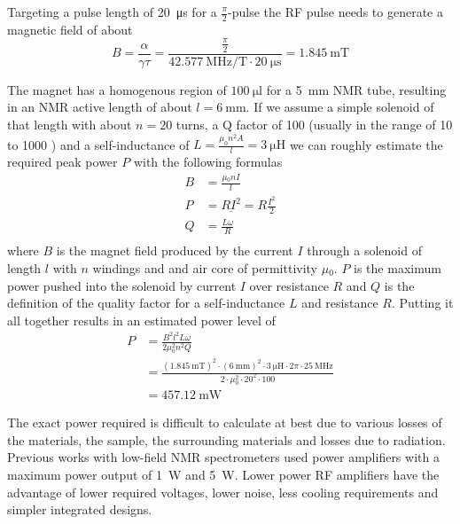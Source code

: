 Targeting a pulse length of \qty{20}{\micro\second} for a  \(\frac{\pi}{2}\)-pulse the RF pulse needs to generate a magnetic field of about
\[
    B = \frac{\alpha}{\gamma\tau} = \frac{\frac{\pi}{2}}{\qty{42.577}{\mega\hertz\per\tesla}\cdot{}\qty{20}{\micro\second}} = \qty{1.845}{\milli\tesla}
\]

The magnet has a homogenous region of \(\qty{100}{\micro\litre}\) for a \qty{5}{\milli\meter} NMR tube, resulting in an NMR active length of about \(l = \qty{6}{\milli\meter}\). If we assume a simple solenoid of that length with about \(n = 20\) turns, a Q factor of 100 (usually in the range of 10 to 1000 \cite{mispelterNMRProbeheadsBiophysical2015}) and a self-inductance of \(L = \frac{\mu_0n^2A}{l} = \qty{3}{\micro\henry}\) we can roughly estimate the required peak power \(P\) with the following formulas 
\begin{align}
    B & = \frac{\mu{}_0nI}{l}              \\
    P & = R\underbar{I}^2 = R\frac{I^2}{2} \\
    Q & = \frac{L\omega}{R}                \\
\end{align}
where \(B\) is the magnet field produced by the current \(I\) through a solenoid of length \(l\) with \(n\) windings and and air core of permittivity \(\mu{}_0\). \(P\) is the maximum power pushed into the solenoid by current \(I\) over resistance \(R\) and \(Q\) is the definition of the quality factor for a self-inductance \(L\) and resistance \(R\). Putting it all together results in an estimated power level of
\begin{align}
    P & = \frac{B^2l^2L\omega}{2\mu{}_0^2n^2Q}                                                                                                                                              \\
      & = \frac{(\qty{1.845}{\milli\tesla})^2 \cdot (\qty{6}{\milli\metre})^2 \cdot \qty{3}{\micro\henry} \cdot 2\pi{} \cdot \qty{25}{\mega\hertz}}{2 \cdot \mu{}_0^2 \cdot 20^2 \cdot 100} \\
      & = \qty{457.12}{\milli\watt}
\end{align}

The exact power required is difficult to calculate at best due to various losses of the materials, the sample, the surrounding materials and losses due to radiation. Previous works with low-field NMR spectrometers used power amplifiers with a maximum power output of \qty{1}{\watt}\cite{chenUltralowCostNMR2015} and \qty{5}{W}\cite{louis-josephDesigningBuildingLowcost2019}. Lower power RF amplifiers have the advantage of lower required voltages, lower noise, less cooling requirements and simpler integrated designs.

